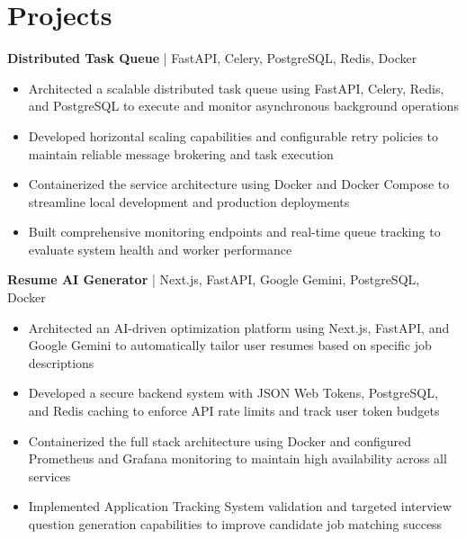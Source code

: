 \section*{Projects}
\textbf{Distributed Task Queue} | FastAPI, Celery, PostgreSQL, Redis, Docker \\
\vspace{-9pt}
\begin{itemize}
  \item Architected a scalable distributed task queue using FastAPI, Celery, Redis, and PostgreSQL to execute and monitor asynchronous background operations
  \item Developed horizontal scaling capabilities and configurable retry policies to maintain reliable message brokering and task execution
  \item Containerized the service architecture using Docker and Docker Compose to streamline local development and production deployments
  \item Built comprehensive monitoring endpoints and real-time queue tracking to evaluate system health and worker performance
\end{itemize}


\textbf{Resume AI Generator} | Next.js, FastAPI, Google Gemini, PostgreSQL, Docker \\ %
\vspace{-9pt}
\begin{itemize}
  \item Architected an AI-driven optimization platform using Next.js, FastAPI, and Google Gemini to automatically tailor user resumes based on specific job descriptions
  \item Developed a secure backend system with JSON Web Tokens, PostgreSQL, and Redis caching to enforce API rate limits and track user token budgets
  \item Containerized the full stack architecture using Docker and configured Prometheus and Grafana monitoring to maintain high availability across all services
  \item Implemented Application Tracking System validation and targeted interview question generation capabilities to improve candidate job matching success
\end{itemize}


